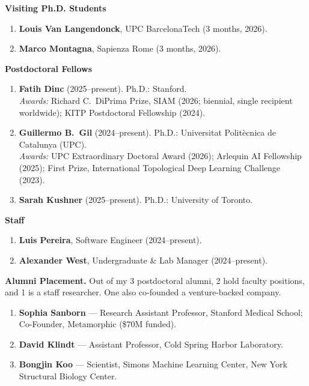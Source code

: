 \smallskip
\noindent\textbf{Visiting Ph.D. Students}
\begin{enumerate}[leftmargin=*,itemsep=0.2em,topsep=0.2em,parsep=0pt,partopsep=0pt]
\raggedright
  \item \textbf{Louis Van Langendonck}, UPC BarcelonaTech (3 months, 2026).
  \item \textbf{Marco Montagna}, Sapienza Rome (3 months, 2026).
\end{enumerate}

\smallskip
\noindent\textbf{Postdoctoral Fellows}
\begin{enumerate}[leftmargin=*,itemsep=0.35em,topsep=0.2em,parsep=0pt,partopsep=0pt]
\raggedright
  \item \textbf{Fatih Dinc} (2025--present). Ph.D.: Stanford.\\
        \textit{Awards:} Richard C.\ DiPrima Prize, SIAM (2026; biennial, single recipient worldwide); KITP Postdoctoral Fellowship (2024).
  \item \textbf{Guillermo B.\ Gil} (2024--present). Ph.D.: Universitat Politècnica de Catalunya (UPC). \\
        \textit{Awards:} UPC Extraordinary Doctoral Award (2026); Arlequin AI Fellowship (2025); First Prize, International Topological Deep Learning Challenge (2023). 
  \item \textbf{Sarah Kushner} (2025--present). Ph.D.: University of Toronto.
\end{enumerate}

\smallskip
\noindent\textbf{Staff}
\begin{enumerate}[leftmargin=*,itemsep=0.2em,topsep=0.2em,parsep=0pt,partopsep=0pt]
\raggedright
  \item \textbf{Luis Pereira}, Software Engineer (2024--present).
  \item \textbf{Alexander West}, Undergraduate \& Lab Manager (2024--present).
\end{enumerate}

\smallskip
\noindent\textbf{Alumni Placement.} Out of my 3 postdoctoral alumni, 2 hold faculty positions, and 1 is a staff researcher. One also co-founded a venture-backed company.

\begin{enumerate}[leftmargin=*,itemsep=0.2em,topsep=0.2em,parsep=0pt,partopsep=0pt]
\raggedright
  \item \textbf{Sophia Sanborn} --- Research Assistant Professor, Stanford Medical School; Co-Founder, Metamorphic (\$70M funded).
  \item \textbf{David Klindt} --- Assistant Professor, Cold Spring Harbor Laboratory.
  \item \textbf{Bongjin Koo} --- Scientist, Simons Machine Learning Center, New York Structural Biology Center.
\end{enumerate}

